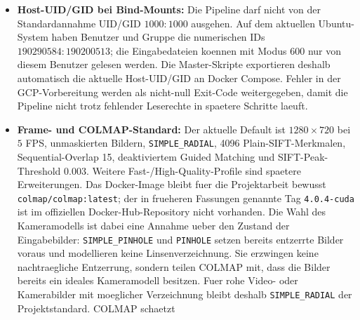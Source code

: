 \documentclass[12pt,a4paper]{article}
\begin{document}
\begin{itemize}
            Der Commit \texttt{e254000} enthaelt neben den mask-aware Aenderungen
            von \texttt{48bbfdd} insbesondere die Schutzlogik fuer ungueltige
            oder zu kleine Poisson-Punktwolken sowie die freigegebene
            c9000-Route. Der Dockerfile-Parameter \texttt{SUGAR\_REF} ist auf
            denselben vollstaendigen Commit gepinnt. Das lokale
            \texttt{docker-compose.sugar-dev.yml}-Overlay bleibt fuer schnelle
            Fork-Entwicklung nutzbar; bei einem offiziellen Lauf ist zu pruefen,
            dass Parent-Gitlink, Docker-\texttt{SUGAR\_REF} und lokaler
            Submodul-Commit identisch sind.
    \item \textbf{Host-UID/GID bei Bind-Mounts:} Die Pipeline darf nicht von
          der Standardannahme UID/GID $1000:1000$ ausgehen. Auf dem aktuellen
          Ubuntu-System haben Benutzer und Gruppe die numerischen IDs
          $190290584:190200513$; die Eingabedateien koennen mit Modus 600 nur
          von diesem Benutzer gelesen werden. Die Master-Skripte exportieren
          deshalb automatisch die aktuelle Host-UID/GID an Docker Compose.
          Fehler in der GCP-Vorbereitung werden als nicht-null Exit-Code
          weitergegeben, damit die Pipeline nicht trotz fehlender Leserechte
          in spaetere Schritte laeuft.
    \item \textbf{Frame- und COLMAP-Standard:} Der aktuelle Default ist
          $1280\times720$ bei $5$ FPS, unmaskierten Bildern,
          \texttt{SIMPLE\_RADIAL}, 4096 Plain-SIFT-Merkmalen,
          Sequential-Overlap 15, deaktiviertem Guided Matching und
            SIFT-Peak-Threshold 0.003. Weitere Fast-/High-Quality-Profile sind
                spaetere Erweiterungen. Das Docker-Image bleibt fuer die
                Projektarbeit bewusst \texttt{colmap/colmap:latest}; der in frueheren
                Fassungen genannte Tag \texttt{4.0.4-cuda} ist im offiziellen
                Docker-Hub-Repository nicht vorhanden. Die Wahl des Kameramodells ist
                dabei eine Annahme ueber den Zustand der Eingabebilder:
                \texttt{SIMPLE\_PINHOLE} und \texttt{PINHOLE} setzen bereits
                entzerrte Bilder voraus und modellieren keine Linsenverzeichnung.
                Sie erzwingen keine nachtraegliche Entzerrung, sondern teilen COLMAP
                mit, dass die Bilder bereits ein ideales Kameramodell besitzen.
                Fuer rohe Video- oder Kamerabilder mit moeglicher Verzeichnung bleibt
                deshalb \texttt{SIMPLE\_RADIAL} der Projektstandard. COLMAP schaetzt

\end{itemize}
\end{document}
